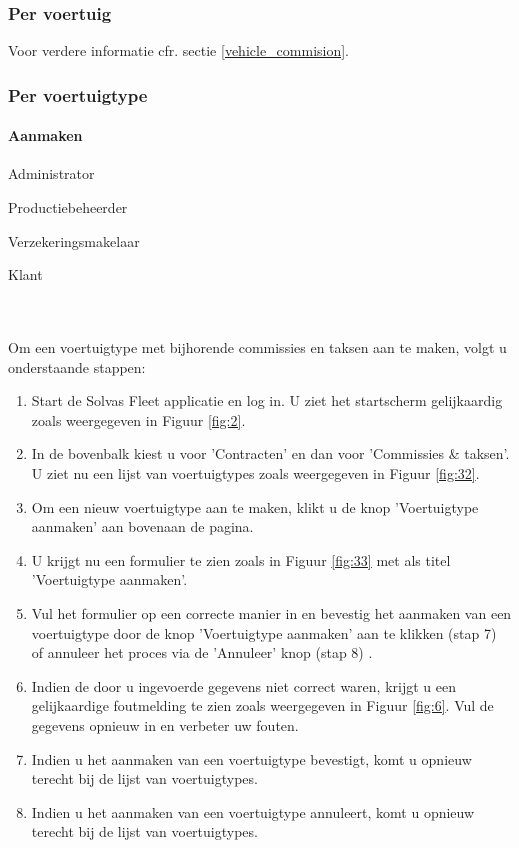 \documentclass[11pt,openany]{article}
\newcommand{\cmark}{\ding{51}}%
\newcommand{\xmark}{\ding{55}}%
\newcommand{\done}{\rlap{$\square$}{\raisebox{2pt}{\large\hspace{1pt}\cmark}}%
	\hspace{-2.5pt}}
\newcommand{\wontfix}{\rlap{$\square$}{\large\hspace{1pt}\xmark}}
\begin{document}
\subsubsection{Per voertuig}
Voor verdere informatie cfr. sectie \ref{vehicle_commision}.
\subsubsection{Per voertuigtype}
\paragraph{Aanmaken}
\begin{todolist}
	\item[\done] Administrator
	\item[\done] Productiebeheerder
	\item[\done] Verzekeringsmakelaar
	\item[\wontfix] Klant 
\end{todolist}
\\
\\
Om een voertuigtype met bijhorende commissies en taksen aan te maken, volgt u onderstaande stappen:
\begin{enumerate}
	\item Start de Solvas Fleet applicatie en log in. U ziet het startscherm gelijkaardig zoals weergegeven in Figuur \ref{fig:2}.
	\item In de bovenbalk kiest u voor 'Contracten' en dan voor 'Commissies \& taksen'. U ziet nu een lijst van voertuigtypes zoals weergegeven in Figuur \ref{fig:32}.
	\item Om een nieuw voertuigtype aan te maken, klikt u de knop 'Voertuigtype aanmaken' aan bovenaan de pagina.
	\item U krijgt nu een formulier te zien zoals in Figuur \ref{fig:33} met als titel 'Voertuigtype aanmaken'.
	\item Vul het formulier op een correcte manier in en bevestig het aanmaken van een voertuigtype door de knop 'Voertuigtype aanmaken' aan te klikken (stap 7) of annuleer het proces via de 'Annuleer' knop (stap 8) .
	\item Indien de door u ingevoerde gegevens niet correct waren, krijgt u een gelijkaardige foutmelding te zien zoals weergegeven in Figuur \ref{fig:6}. Vul de gegevens opnieuw in en verbeter uw fouten.
	\item Indien u het aanmaken van een voertuigtype bevestigt, komt u opnieuw terecht bij de lijst van voertuigtypes. 
	\item Indien u het aanmaken van een voertuigtype annuleert, komt u opnieuw terecht bij de lijst van voertuigtypes.
	
\end{enumerate}
\end{document}
